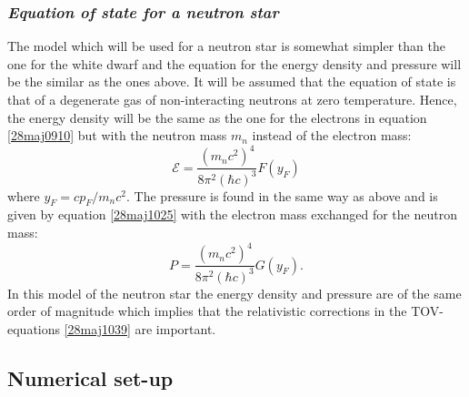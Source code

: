 \documentclass[twocolumn]{article}
\begin{document}
\begin{large}
\subsubsection*{\textit{Equation of state for a neutron star}}
The model which will be used for a neutron star is somewhat simpler than the one for the white dwarf and the equation for the energy density and pressure will be the similar as the ones above. It will be assumed that the equation of state is that of a degenerate gas of non-interacting neutrons at zero temperature. Hence, the energy density will be the same as the one for the electrons in equation \eqref{28maj0910} but with the neutron mass $m_n$ instead of the electron mass:
\begin{equation}
    \label{28maj1446}
    \mathcal{E} = \frac{(m_nc^2)^4}{8\pi^2(\hbar c)^3}F(y_F)
\end{equation}
where $y_F = cp_F/m_nc^2$. The pressure is found in the same way as above and is given by equation \eqref{28maj1025} with the electron mass exchanged for the neutron mass:
\begin{equation}
    \label{28maj1447}
    P = \frac{(m_nc^2)^4}{8\pi^2(\hbar c)^3}G(y_F).
\end{equation}
In this model of the neutron star the energy density and pressure are of the same order of magnitude which implies that the relativistic corrections in the TOV-equations \eqref{28maj1039} are important. 



\subsection*{Numerical set-up}

\end{large}
\end{document}
